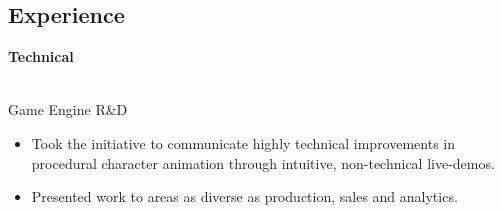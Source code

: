 \documentclass[margin]{res}
\begin{document}
\begin{sloppypar}
\begin{resume}
\section{Experience}
\textbf{Technical}


 \\
Game Engine R\&D
\begin{itemize}
\item Took the initiative to communicate highly technical improvements in procedural character animation through intuitive, non-technical live-demos.
\item Presented work to areas as diverse as production, sales and analytics.
\end{itemize}


\end{resume}
\end{sloppypar}
\end{document}
